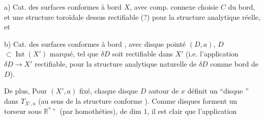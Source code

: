 a) Cat. des surfaces conformes à bord $X$,
avec comp. connexe  choisie $C$ du bord,
et une structure toroïdale dessus
rectifiable (?) pour la structure
analytique réelle, et

b) Cat. des surfaces conformes à
bord , avec  disque pointé $(D,a)$, $D$
$\subset\operatorname{Int}(X')$ marqué, tel que $\delta D$ soit rectifiable
dans $X'$ (i.e. l'application $\delta D\longrightarrow X'$
rectifiable, pour la structure analytique
naturelle de $\delta D$ comme bord de $D$).

De plus, Pour $(X',a)$ fixé, chaque
disque $D$ autour de $x$ définit un
``disque '' dans $T_{X',a}$ (au sens de
la structure  conforme ). Comme
 disques forment un torseur sous
$\mathbb R^{*+}$ (par homothéties), 
de dim $1$, il est clair que l'application
